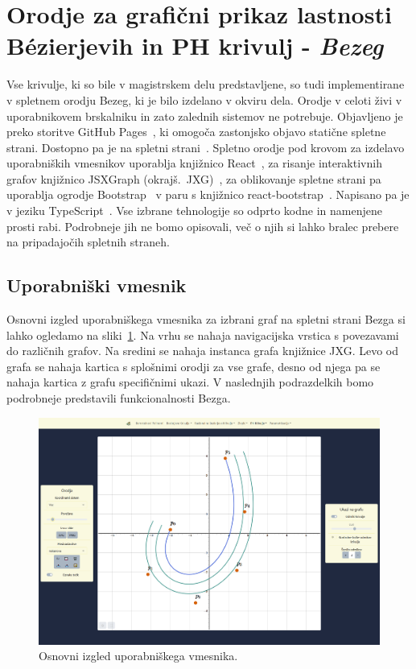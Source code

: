 \documentclass[isrm2, tisk]{fmfdelo}
\begin{document}
    \section{Orodje za grafični prikaz lastnosti Bézierjevih in PH krivulj - \textit{Bezeg}}
    Vse krivulje, ki so bile v magistrskem delu predstavljene, so tudi implementirane v spletnem orodju Bezeg, ki je bilo izdelano v okviru dela.
    Orodje v celoti živi v uporabnikovem brskalniku in zato zalednih sistemov ne potrebuje.
    Objavljeno je preko storitve GitHub Pages~\cite{github-pages}, ki omogoča zastonjsko objavo statične spletne strani.
    Dostopno pa je na spletni strani~\cite{spletna-bezeg}.
    Spletno orodje pod krovom za izdelavo uporabniških vmesnikov uporablja knjižnico React~\cite{react},
    za risanje interaktivnih grafov knjižnico JSXGraph (okrajš.\ JXG)~\cite{jxg}, za oblikovanje spletne strani pa uporablja ogrodje Bootstrap~\cite{bootstrap} v paru s knjižnico react-bootstrap~\cite{react-bootstrap}.
    Napisano pa je v jeziku TypeScript~\cite{typescript}.
    Vse izbrane tehnologije so odprto kodne in namenjene prosti rabi.
    Podrobneje jih ne bomo opisovali, več o njih si lahko bralec prebere na pripadajočih spletnih straneh.

    \subsection{Uporabniški vmesnik}\label{subsec:gui}
    Osnovni izgled uporabniškega vmesnika za izbrani graf na spletni strani Bezga si lahko ogledamo na sliki~\ref{fig:bezeg:osnovni-izgled}.
    Na vrhu se nahaja navigacijska vrstica s povezavami do različnih grafov.
    Na sredini se nahaja instanca grafa knjižnice JXG.
    Levo od grafa se nahaja kartica s splošnimi orodji za vse grafe, desno od njega pa se nahaja kartica z grafu specifičnimi ukazi.
    V naslednjih podrazdelkih bomo podrobneje predstavili funkcionalnosti Bezga.
    \begin{figure}[h]
        \centering
        \includegraphics[width = \textwidth]{images/bezeg/osnovni-izgled}
        \caption{Osnovni izgled uporabniškega vmesnika.}
        \label{fig:bezeg:osnovni-izgled}
    \end{figure}
\end{document}

